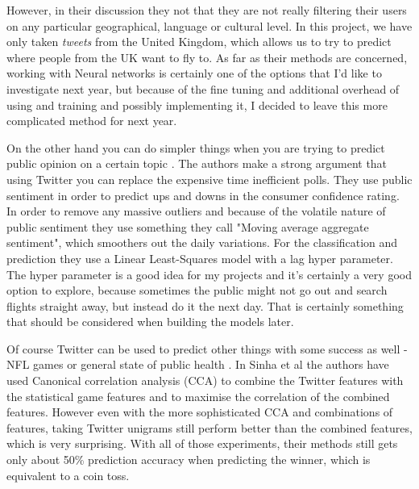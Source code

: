 \documentclass[minf,twoside,singlespacing,parskip,frontabs]{infthesis}
\begin{document}
However, in their discussion they not that they are not really filtering their users on any particular geographical, language or cultural level. In this project, we have only taken \emph{tweets} from the United Kingdom, which allows us to try to predict where people from the UK want to fly to. As far as their methods are concerned, working with Neural networks is certainly one of the options that I'd like to investigate next year, but because of the fine tuning and additional overhead of using and training and possibly implementing it, I decided to leave this more complicated method for next year. 


On the other hand you can do simpler things when you are trying to predict public opinion on a certain topic \cite{twitpoll}. The authors make a strong argument that using Twitter you can replace the expensive time inefficient polls. They use public sentiment in order to predict ups and downs in the consumer confidence rating. In order to remove any massive outliers and because of the volatile nature of public sentiment they use something they call "Moving average aggregate sentiment", which smoothers out the daily variations. For the classification and prediction they use a Linear Least-Squares model with a lag hyper parameter. The hyper parameter is a good idea for my projects and it's certainly a very good option to explore, because sometimes the public might not go out and search flights straight away, but instead do it the next day. That is certainly something that should be considered when building the models later.


Of course Twitter can be used to predict other things with some success as well - NFL games \cite{twitnfl} or general state of public health \cite{twitflu}.  In Sinha et al \cite{twitnfl} the authors have used Canonical correlation analysis (CCA) to combine the Twitter features with the statistical game features and to maximise the correlation of the combined features. However even with the more sophisticated CCA and combinations of features, taking Twitter unigrams still perform better than the combined features, which is very surprising. With all of those experiments, their methods still gets only about 50\% prediction accuracy when predicting the winner, which is equivalent to a coin toss. 
\end{document}

